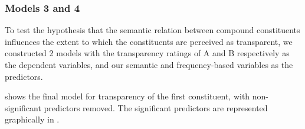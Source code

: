\subsubsection{Models 3 and 4}
To test the hypothesis that the semantic relation between compound
constituents influences the extent to which the constituents are
perceived as transparent, we constructed 2 models with
the transparency ratings of A and B respectively as the dependent
variables, and our semantic and frequency-based variables as the
predictors.


 shows the final model for transparency of
the first constituent, with non-significant predictors removed. The significant predictors are
represented graphically in . 

% 



